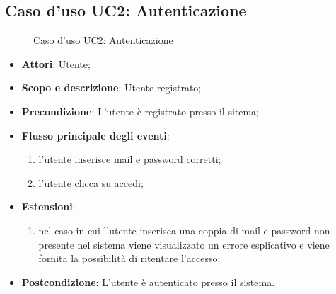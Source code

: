 \documentclass[12pt,a4paper]{article}
\begin{document}
\subsection{Caso d'uso UC2: Autenticazione}
\begin{figure}[H]
	\centering

	\caption{Caso d'uso UC2: Autenticazione}\label{fig:UC2} 
\end{figure}\begin{itemize}
\item \textbf{Attori}: Utente;
\item \textbf{Scopo e descrizione}: Utente registrato; 
\item \textbf{Precondizione}: L'utente è registrato presso il sitema;

\item \textbf{Flusso principale degli eventi}:
\begin{enumerate}
	\item l'utente inserisce mail e password corretti;
	\item l'utente clicca su accedi;
	
\end{enumerate}
\item \textbf{Estensioni}:
\begin{enumerate}
	\item nel caso in cui l'utente inserisca una coppia di mail e password non presente nel sistema viene visualizzato un errore esplicativo e viene fornita la possibilità di ritentare l'accesso;
	
\end{enumerate}
\item \textbf{Postcondizione}: L'utente è autenticato presso il sistema.
\end{itemize}
\hypertarget{UC3}{}
\end{document}
